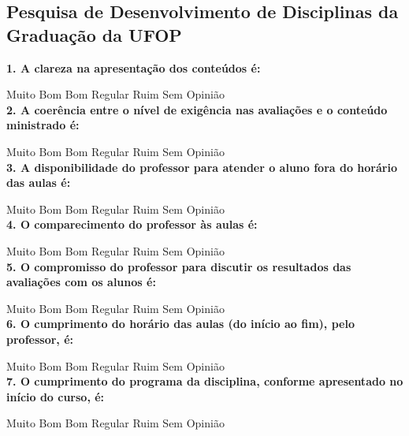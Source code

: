 \documentclass[
  12pt,       %
  openright,      %
  oneside,      %
  a4paper,      %
  english,      %
  french,        %
  spanish,     %
  brazil        %
  ]{abntex2-decsi}
\begin{document}
\begin{anexosenv}

\setlength{\parindent}{0in}

\partanexos

\chapter{Pesquisa de Desenvolvimento de Disciplinas da Graduação da UFOP}\label{pddgu}
    \textbf{1. A clareza na apresentação dos conteúdos é:}
		
        \Circle Muito Bom \Circle Bom \Circle Regular \Circle Ruim \Circle Sem Opinião\\
        
    \textbf{2. A coerência entre o nível de exigência nas avaliações e o conteúdo ministrado é:}

   		\Circle Muito Bom \Circle Bom \Circle Regular \Circle Ruim \Circle Sem Opinião\\
        
    \textbf{3. A disponibilidade do professor para atender o aluno fora do horário das aulas é:}

      	\Circle Muito Bom \Circle Bom \Circle Regular \Circle Ruim \Circle Sem Opinião\\
        
    \textbf{4. O comparecimento do professor às aulas é:}

        \Circle Muito Bom \Circle Bom \Circle Regular \Circle Ruim \Circle Sem Opinião\\
        
    \textbf{5. O compromisso do professor para discutir os resultados das avaliações com os alunos é:}

        \Circle Muito Bom \Circle Bom \Circle Regular \Circle Ruim \Circle Sem Opinião\\
        
    \textbf{6. O cumprimento do horário das aulas (do início ao fim), pelo professor, é:}

        \Circle Muito Bom \Circle Bom \Circle Regular \Circle Ruim \Circle Sem Opinião\\
        
    \textbf{7. O cumprimento do programa da disciplina, conforme apresentado no início do curso, é:}

        \Circle Muito Bom \Circle Bom \Circle Regular \Circle Ruim \Circle Sem Opinião\\
        

\end{anexosenv}
\end{document}
